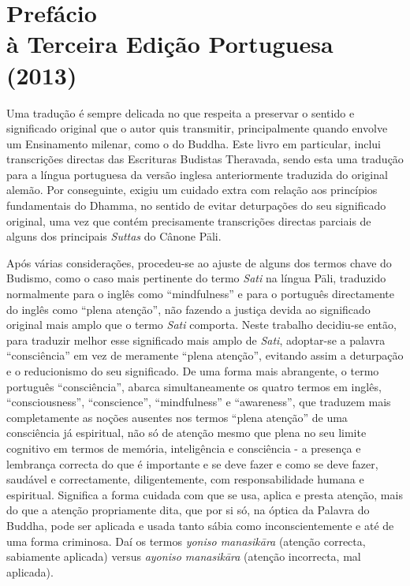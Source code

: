\chapter[Prefácio à Terceira Edição Portuguesa (2013)]{Prefácio\\ à Terceira Edição Portuguesa\\ (2013)}

Uma tradução é sempre delicada no que respeita a preservar o sentido e
significado original que o autor quis transmitir, principalmente quando envolve
um Ensinamento milenar, como o do Buddha. Este livro em particular, inclui
transcrições directas das Escrituras Budistas Theravada, sendo esta uma tradução
para a língua portuguesa da versão inglesa anteriormente traduzida do original
alemão. Por conseguinte, exigiu um cuidado extra com relação aos princípios
fundamentais do Dhamma, no sentido de evitar deturpações do seu significado
original, uma vez que contém precisamente transcrições directas parciais de
alguns dos principais \emph{Suttas} do Cânone Pāli.

Após várias considerações, procedeu-se ao ajuste de alguns dos termos chave do
Budismo, como o caso mais pertinente do termo \emph{Sati} na língua Pāli,
traduzido normalmente para o inglês como ``mindfulness'' e para o português
directamente do inglês como ``plena atenção'', não fazendo a justiça devida ao
significado original mais amplo que o termo \emph{Sati} comporta. Neste trabalho
decidiu-se então, para traduzir melhor esse significado mais amplo de
\emph{Sati}, adoptar-se a palavra ``consciência'' em vez de meramente ``plena
atenção'', evitando assim a deturpação e o reducionismo do seu significado. De
uma forma mais abrangente, o termo português ``consciência'', abarca
simultaneamente os quatro termos em inglês, ``consciousness'', ``conscience'',
``mindfulness'' e ``awareness'', que traduzem mais completamente as noções
ausentes nos termos ``plena atenção'' de uma consciência já espiritual, não só
de atenção mesmo que plena no seu limite cognitivo em termos de memória,
inteligência e consciência - a presença e lembrança correcta do que é importante
e se deve fazer e como se deve fazer, saudável e correctamente, diligentemente,
com responsabilidade humana e espiritual. Significa a forma cuidada com que se
usa, aplica e presta atenção, mais do que a atenção propriamente dita, que por
si só, na óptica da Palavra do Buddha, pode ser aplicada e usada tanto sábia
como inconscientemente e até de uma forma criminosa. Daí os termos \emph{yoniso
  manasikāra} (atenção correcta, sabiamente aplicada) versus \emph{ayoniso
  manasikāra} (atenção incorrecta, mal aplicada).

